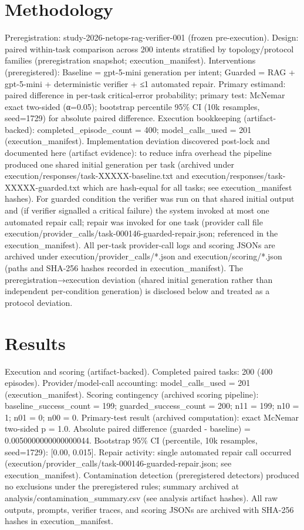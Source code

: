 \documentclass[conference]{IEEEtran}
\begin{document}
\section{Methodology}
Preregistration: study-2026-netops-rag-verifier-001 (frozen pre-execution). Design: paired within-task comparison across 200 intents stratified by topology/protocol families (preregistration snapshot; execution\_manifest). Interventions (preregistered): Baseline = gpt-5-mini generation per intent; Guarded = RAG + gpt-5-mini + deterministic verifier + ≤1 automated repair. Primary estimand: paired difference in per-task critical-error probability; primary test: McNemar exact two-sided (α=0.05); bootstrap percentile 95\% CI (10k resamples, seed=1729) for absolute paired difference. Execution bookkeeping (artifact-backed): completed\_episode\_count = 400; model\_calls\_used = 201 (execution\_manifest). Implementation deviation discovered post-lock and documented here (artifact evidence): to reduce infra overhead the pipeline produced one shared initial generation per task (archived under execution/responses/task-XXXXX-baseline.txt and execution/responses/task-XXXXX-guarded.txt which are hash-equal for all tasks; see execution\_manifest hashes). For guarded condition the verifier was run on that shared initial output and (if verifier signalled a critical failure) the system invoked at most one automated repair call; repair was invoked for one task (provider call file execution/provider\_calls/task-000146-guarded-repair.json; referenced in the execution\_manifest). All per-task provider-call logs and scoring JSONs are archived under execution/provider\_calls/*.json and execution/scoring/*.json (paths and SHA-256 hashes recorded in execution\_manifest). The preregistration→execution deviation (shared initial generation rather than independent per-condition generation) is disclosed below and treated as a protocol deviation.

\section{Results}
Execution and scoring (artifact-backed). Completed paired tasks: 200 (400 episodes). Provider/model-call accounting: model\_calls\_used = 201 (execution\_manifest). Scoring contingency (archived scoring pipeline): baseline\_success\_count = 199; guarded\_success\_count = 200; n11 = 199; n10 = 1; n01 = 0; n00 = 0. Primary-test result (archived computation): exact McNemar two-sided p = 1.0. Absolute paired difference (guarded - baseline) = 0.0050000000000000044. Bootstrap 95\% CI (percentile, 10k resamples, seed=1729): [0.00, 0.015]. Repair activity: single automated repair call occurred (execution/provider\_calls/task-000146-guarded-repair.json; see execution\_manifest). Contamination detection (preregistered detectors) produced no exclusions under the preregistered rules; summary archived at analysis/contamination\_summary.csv (see analysis artifact hashes). All raw outputs, prompts, verifier traces, and scoring JSONs are archived with SHA-256 hashes in execution\_manifest.
\end{document}
